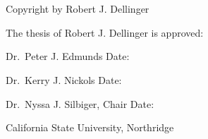 \documentclass[
  12pt,
]{article}
\begin{document}
\newpage
\pagestyle{plain}

\section*{}

\vfill

\begin{center}
Copyright by Robert J. Dellinger
\end{center}

\newpage

The thesis of Robert J. Dellinger is approved:

\vspace{1.5in}

\underline{\hspace{2.5in}}\hspace{0.5in} \underline{\hspace{2in}}

Dr.~Peter J. Edmunds \hspace{1.65in} Date:

\vspace{0.5in}

\underline{\hspace{2.5in}}\hspace{0.5in} \underline{\hspace{2in}}

Dr.~Kerry J. Nickols \hspace{1.75in} Date:

\vspace{0.5in}

\underline{\hspace{2.5in}}\hspace{0.5in} \underline{\hspace{2in}}

Dr.~Nyssa J. Silbiger, Chair \hspace{1.3in} Date:

\vfill

\begin{center}
California State University, Northridge
\end{center}

\newpage

\vspace*{\fill}
\end{document}

